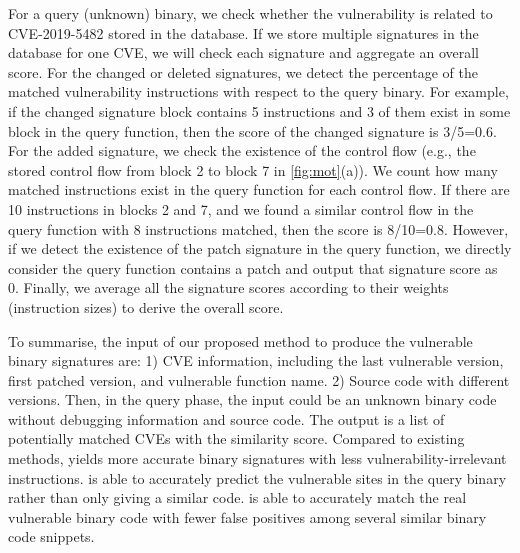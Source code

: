 For a query (unknown) binary, we check whether the vulnerability is related to CVE-2019-5482 stored in the database. 
If we store multiple signatures in the database for one CVE, we will check each signature and aggregate an overall score. 
For the changed or deleted signatures, we detect the percentage of the matched vulnerability instructions with respect to the query binary.
For example, if the changed signature block contains 5 instructions and 3 of them exist in some block in the query function, then the score of the changed signature is 3/5=0.6. 
For the added signature, we check the existence of the control flow (e.g., the stored control flow from block 2 to block 7 in \autoref{fig:mot}(a)). 
We count how many matched instructions exist in the query function for each control flow. 
If there are 10 instructions in blocks 2 and 7, and we found a similar control flow in the query function with 8 instructions matched, then the score is 8/10=0.8. 
However, if we detect the existence of the patch signature in the query function, we directly consider the query function contains a patch and output that signature score as 0. 
Finally, we average all the signature scores according to their weights (instruction sizes) to derive the overall score.


To summarise, the input of our proposed method to produce the vulnerable binary signatures are: 1) CVE information, including the last vulnerable version, first patched version, and vulnerable function name. 2) Source code with different versions. 
Then, in the query phase, the input could be an unknown binary code without debugging information and source code. 
The output is a list of potentially matched CVEs with the similarity score. 
Compared to existing methods, \name yields more accurate binary signatures with less vulnerability-irrelevant instructions. \name is able to accurately predict the vulnerable sites in the query binary rather than only giving a similar code. \name is able to accurately match the real vulnerable binary code with fewer false positives among several similar binary code snippets.


